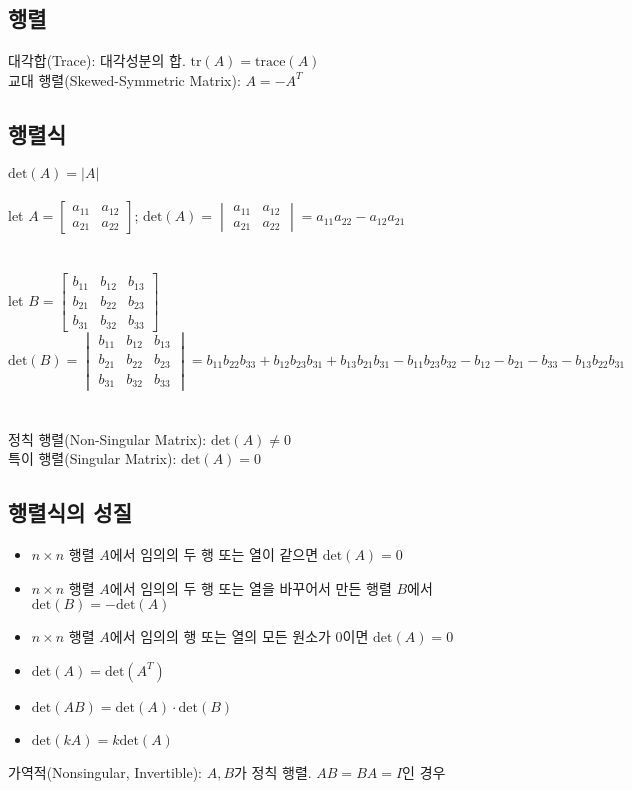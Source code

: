 \subsection{행렬}
대각합(Trace): 대각성분의 합. $\mathrm{tr}(A) = \mathrm{trace}(A)$\\
교대 행렬(Skewed-Symmetric Matrix): $A=-A^T$

\subsection{행렬식}
$\mathrm{det}(A) = |A|$\\\\
let $A = \begin{bmatrix}
    a_{11} & a_{12}\\
    a_{21} & a_{22}
\end{bmatrix}$;
$\mathrm{det}(A) = \begin{vmatrix}
    a_{11} & a_{12}\\
    a_{21} & a_{22}
\end{vmatrix} = a_{11}a_{22}-a_{12}a_{21}$\\\\\\
let $B = \begin{bmatrix}
    b_{11}&b_{12}&b_{13}\\
    b_{21}&b_{22}&b_{23}\\
    b_{31}&b_{32}&b_{33}
\end{bmatrix}$\\
$\mathrm{det}(B) = \begin{vmatrix}
    b_{11}&b_{12}&b_{13}\\
    b_{21}&b_{22}&b_{23}\\
    b_{31}&b_{32}&b_{33}
\end{vmatrix} = b_{11}b_{22}b_{33}+b_{12}b_{23}b_{31}+b_{13}b_{21}b_{31}-b_{11}b_{23}b_{32}-b_{12}-b_{21}-b_{33}-b_{13}b_{22}b_{31}$\\\\\\
정칙 행렬(Non-Singular Matrix): $\mathrm{det}(A) \neq 0$\\
특이 행렬(Singular Matrix): $\mathrm{det}(A) = 0$\\
\subsection{행렬식의 성질}
\begin{itemize}
    \item $n \times n$ 행렬 $A$에서 임의의 두 행 또는 열이 같으면 $\mathrm{det}(A) = 0$
    \item $n \times n$ 행렬 $A$에서 임의의 두 행 또는 열을 바꾸어서 만든 행렬 $B$에서 $\mathrm{det}(B) = -\mathrm{det}(A)$
    \item $n \times n$ 행렬 $A$에서 임의의 행 또는 열의 모든 원소가 $0$이면 $\mathrm{det}(A) = 0$
    \item $\mathrm{det}(A) = \mathrm{det}(A^T)$
    \item $\mathrm{det}(AB) = \mathrm{det}(A) \cdot \mathrm{det}(B)$
    \item $\mathrm{det}(kA) = k\mathrm{det}(A)$
\end{itemize}$$$$
가역적(Nonsingular, Invertible): $A, B$가 정칙 행렬. $AB=BA=I$인 경우
